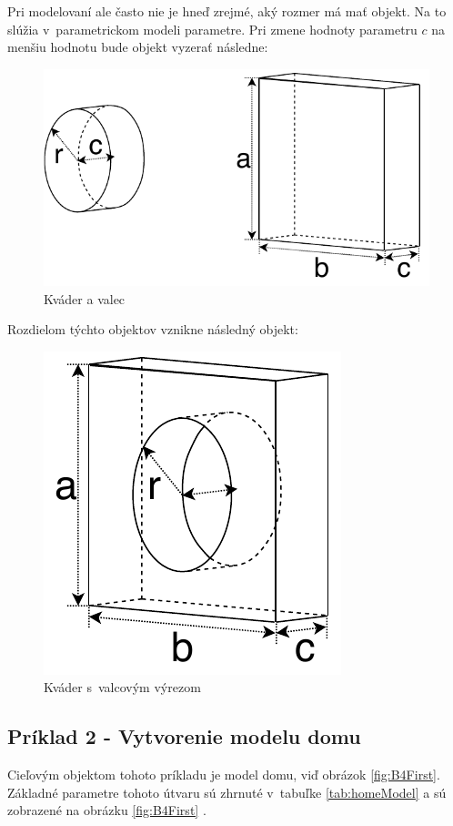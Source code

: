 Pri modelovaní ale často nie je hneď zrejmé, aký rozmer má mať objekt. Na to slúžia v~parametrickom modeli parametre. Pri zmene hodnoty parametru $c$ na menšiu hodnotu bude objekt vyzerať následne:\nopagebreak
\begin{figure}[H]
	\centering
	\includegraphics[height=0.3\textwidth]{obrazky-figures/Examples/A3x.pdf}
	\caption{Kváder a valec}
	\label{fig:A3x}
\end{figure}
Rozdielom týchto objektov vznikne následný objekt:\nopagebreak
\begin{figure}[H]
	\centering
	\includegraphics[height=0.3\textwidth]{obrazky-figures/Examples/A4x.pdf}
	\caption{Kváder s~valcovým výrezom}
	\label{fig:A4x}
\end{figure}

\subsection*{Príklad 2 - Vytvorenie modelu domu}
Cieľovým objektom tohoto príkladu je model domu, viď obrázok \ref{fig:B4First}. Základné parametre tohoto útvaru sú zhrnuté v~tabuľke \ref{tab:homeModel}  a sú zobrazené na obrázku \ref{fig:B4First}
\label{sec:homeModel}.
\nopagebreak


